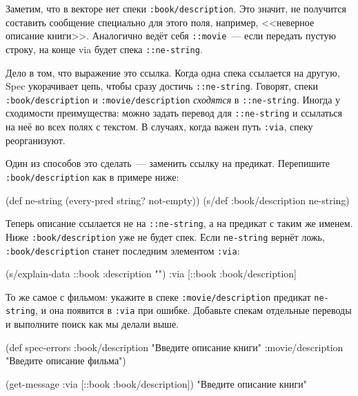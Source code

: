Заметим, что в векторе нет спеки \verb|:book/description|. Это значит, не
получится составить сообщение специально для этого поля, например, <<неверное
описание книги>>. Аналогично ведёт себя \verb|::movie|~--- если передать
пустую строку, на конце via будет спека \verb|::ne-string|.

Дело в том, что выражение 
это ссылка. Когда одна спека ссылается на другую, Spec укорачивает цепь, чтобы
сразу достичь \verb|::ne-string|. Говорят, спеки \verb|:book/description| и
\verb|:movie/description| \emph{сходятся} в \verb|::ne-string|. Иногда у
сходимости преимущества: можно задать перевод для \verb|::ne-string| и
ссылаться на неё во всех полях с текстом. В случаях, когда важен путь
\verb|:via|, спеку реорганизуют.

Один из способов это сделать~--- заменить ссылку на предикат. Перепишите
\verb|:book/description| как в примере ниже:

\begin{english}
  \begin{clojure}
(def ne-string (every-pred string? not-empty))
(s/def :book/description ne-string)
  \end{clojure}
\end{english}

Теперь описание ссылается не на \verb|::ne-string|, а на предикат с таким же
именем. Ниже \verb|:book/description| уже не будет спек. Если
\verb|ne-string| вернёт ложь, \verb|:book/description| станет последним
элементом \verb|:via|:

\begin{english}
  \begin{clojure}
(s/explain-data ::book {:description ""})
{:via [::book :book/description]}
  \end{clojure}
\end{english}

То же самое с фильмом: укажите в спеке \verb|:movie/description| предикат
\verb|ne-string|, и она появится в \verb|:via| при ошибке. Добавьте спекам
отдельные переводы и выполните поиск как мы делали выше.

  \begin{clojure}
(def spec-errors
  {:book/description "Введите описание книги"
   :movie/description "Введите описание фильма"})

(get-message {:via [::book :book/description]})
"Введите описание книги"
  \end{clojure}

